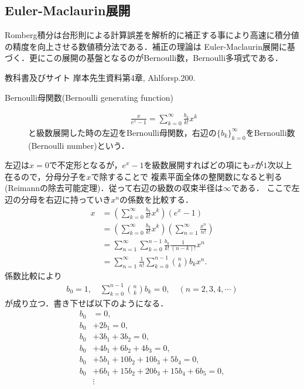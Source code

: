 \documentclass[a4j,papersize,disablejfam,slide,14pt]{jsarticle}
\def\exp#1{e^{#1}} %
\begin{document}
\subsection{{\rm Euler-Maclaurin}展開}
	{\rm Romberg}積分は台形則による計算誤差を解析的に補正する事により高速に積分値の精度を向上させる数値積分法である．補正の理論は
    {\rm Euler-Maclaurin}展開に基づく．更にこの展開の基盤となるのが{\rm Bernoulli}数，{\rm Bernoulli}多項式である．
    \begin{itembox}[l]{教科書及びサイト}
    	{\rm 岸本先生資料\cite{kishimoto_real_analysis}第4章, {\rm Ahlfors}\cite{ahlfors_complex}p.200.}
    \end{itembox}
    \begin{screen}
    	\begin{description}
        	\item[{\rm Bernoulli}母関数({\rm Bernoulli generating function})]
            \begin{align}
            	\frac{x}{\exp{x}-1} = \sum_{k=0}^{\infty} \frac{b_k}{k!} x^k
            \end{align}
            と級数展開した時の左辺を{\rm Bernoulli}母関数，右辺の$\{b_k\}_{k=0}^{\infty}$を{\rm Bernoulli}数({\rm Bernoulli number})という．
        \end{description}
    \end{screen}
    左辺は$x=0$で不定形となるが，$\exp{x}-1$を級数展開すればどの項にも$x$が$1$次以上在るので，分母分子を$x$で除することで
    複素平面全体の整関数になると判る({\rm Reimann}の除去可能定理)．従って右辺の級数の収束半径は$\infty$である．
    ここで左辺の分母を右辺に持っていき$x^n$の係数を比較する．
    \begin{align}
    	x &= \left( \sum_{k=0}^{\infty} \frac{b_k}{k!} x^k \right) (\exp{x}-1) \\
        &= \left( \sum_{k=0}^{\infty} \frac{b_k}{k!} x^k \right) \left( \sum_{n=1}^{\infty} \frac{x^n}{n!} \right) \\
        &= \sum_{n=1}^{\infty} \sum_{k=0}^{n-1} \frac{b_k}{k!}\frac{1}{(n-k)!} x^n \\
        &= \sum_{n=1}^{\infty} \frac{1}{n!} \sum_{k=0}^{n-1} \binom{n}{k} b_k x^n.
    \end{align}
    係数比較により
    \begin{align}
    	b_0=1, \quad \sum_{k=0}^{n-1} \binom{n}{k} b_k = 0, \quad (n=2,3,4,\cdots)
    \end{align}
    が成り立つ．書き下せば以下のようになる．
    \begin{align}
    	b_0 &= 0, \\
        b_0 &+ 2b_1 = 0, \\
        b_0 &+ 3b_1 + 3b_2 = 0, \\
        b_0 &+ 4b_1 + 6b_2 + 4b_3 = 0, \\
        b_0 &+ 5b_1 + 10b_2 + 10b_3 + 5b_4 = 0, \\
        b_0 &+ 6b_1 + 15b_2 + 20b_3 + 15b_4 + 6b_5 = 0, \\
        &\vdots
    \end{align}
\end{document}
